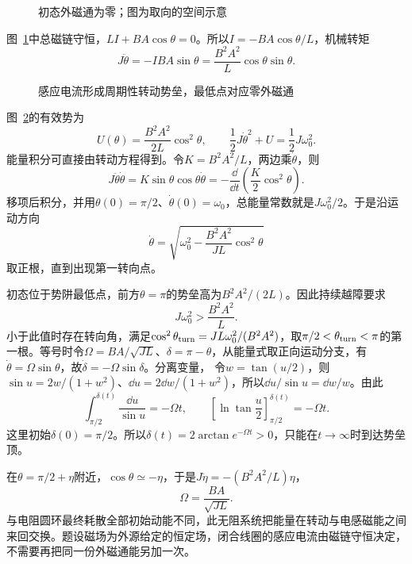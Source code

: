\begin{figure}[H]\centering
{}
\caption{初态外磁通为零；图为取向的空间示意}\label{fig:i4-e15-q}
\end{figure}
\begin{solution}
图~\ref{fig:i4-e15-q}中总磁链守恒，$LI+BA\cos\theta=0$。所以$I=-BA\cos\theta/L$，机械转矩
\[
J\ddot\theta=-IBA\sin\theta
=\frac{B^2A^2}{L}\cos\theta\sin\theta.
\]

\begin{figure}[H]\centering
{}
\caption{感应电流形成周期性转动势垒，最低点对应零外磁通}\label{fig:i4-e15-s}
\end{figure}

图~\ref{fig:i4-e15-s}的有效势为
\[
U(\theta)=\frac{B^2A^2}{2L}\cos^2\theta,\qquad
\frac12J\dot\theta^2+U=\frac12J\omega_0^2.
\]
能量积分可直接由转动方程得到。令$K=B^2A^2/L$，两边乘$\dot\theta$，则
\[
J\ddot\theta\dot\theta=K\sin\theta\cos\theta\dot\theta
=-\frac{\dd}{\dd t}\left(\frac K2\cos^2\theta\right).
\]
移项后积分，并用$\theta(0)=\pi/2$、$\dot\theta(0)=\omega_0$，总能量常数就是$J\omega_0^2/2$。于是沿运动方向
\[
\dot\theta=\sqrt{\omega_0^2-\frac{B^2A^2}{JL}\cos^2\theta}
\]
取正根，直到出现第一转向点。

初态位于势阱最低点，前方$\theta=\pi$的势垒高为$B^2A^2/(2L)$。因此持续越障要求
\[
\boxed{J\omega_0^2>\frac{B^2A^2}{L}}.
\]
小于此值时存在转向角，满足$\cos^2\theta_{\rm turn}=JL\omega_0^2/(B^2A^2)$，取$\pi/2<\theta_{\rm turn}<\pi$的第一根。等号时令$\Omega=BA/\sqrt{JL}$、$\delta=\pi-\theta$，从能量式取正向运动分支，有$\dot\theta=\Omega\sin\theta$，故$\dot\delta=-\Omega\sin\delta$。分离变量，
令$w=\tan(u/2)$，则$\sin u=2w/(1+w^2)$、$\dd u=2\dd w/(1+w^2)$，所以$\dd u/\sin u=\dd w/w$。由此
\[\int_{\pi/2}^{\delta(t)}\frac{\dd u}{\sin u}=-\Omega t,\qquad
\left[\ln\tan\frac u2\right]_{\pi/2}^{\delta(t)}=-\Omega t.\]
这里初始$\delta(0)=\pi/2$。所以$\delta(t)=2\arctan e^{-\Omega t}>0$，只能在$t\to\infty$时到达势垒顶。

在$\theta=\pi/2+\eta$附近，$\cos\theta\simeq-\eta$，于是$J\ddot\eta=-(B^2A^2/L)\eta$，
\[
\boxed{\Omega=\frac{BA}{\sqrt{JL}}}.
\]
与电阻圆环最终耗散全部初始动能不同，此无阻系统把能量在转动与电感磁能之间来回交换。题设磁场为外源给定的恒定场，闭合线圈的感应电流由磁链守恒决定，不需要再把同一份外磁通能另加一次。
\end{solution}


